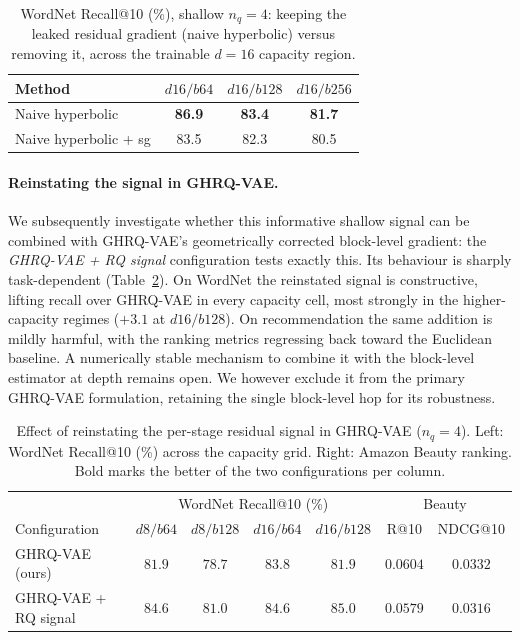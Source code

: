 \documentclass[12pt]{report}
\begin{document}
\begin{table}[h]
\centering
\caption{WordNet Recall@10 (\%), shallow $n_q=4$: keeping the leaked residual gradient (naive hyperbolic) versus removing it, across the trainable $d{=}16$ capacity region.}
\label{tab:gc_leak}
\begin{tabular}{lccc}
\hline
Method & $d16/b64$ & $d16/b128$ & $d16/b256$ \\
\hline
Naive hyperbolic       & \textbf{86.9} & \textbf{83.4} & \textbf{81.7} \\
Naive hyperbolic + sg  & 83.5 & 82.3 & 80.5 \\
\hline
\end{tabular}
\end{table}

\paragraph{Reinstating the signal in GHRQ-VAE.}
We subsequently investigate whether this informative shallow signal can be combined with GHRQ-VAE's geometrically corrected block-level gradient: the \emph{GHRQ-VAE + RQ signal} configuration tests exactly this. Its behaviour is sharply task-dependent (Table~\ref{tab:rq_signal_hybrid}). On WordNet the reinstated signal is constructive, lifting recall over GHRQ-VAE in every capacity cell, most strongly in the higher-capacity regimes ($+3.1$ at $d16/b128$). On recommendation the same addition is mildly harmful, with the ranking metrics regressing back toward the Euclidean baseline. A numerically stable mechanism to combine it with the block-level estimator at depth remains open. We however exclude it from the primary GHRQ-VAE formulation, retaining the single block-level hop for its robustness.

\begin{table}[h]
\centering
\caption{Effect of reinstating the per-stage residual signal in GHRQ-VAE ($n_q=4$). Left: WordNet Recall@10 (\%) across the capacity grid. Right: Amazon Beauty ranking. Bold marks the better of the two configurations per column.}
\label{tab:rq_signal_hybrid}
\begin{tabular}{l|cccc|cc}
\hline
 & \multicolumn{4}{c|}{WordNet Recall@10 (\%)} & \multicolumn{2}{c}{Beauty} \\
Configuration & $d8/b64$ & $d8/b128$ & $d16/b64$ & $d16/b128$ & R@10 & NDCG@10 \\
\hline
GHRQ-VAE (ours)        & $81.9$ & $78.7$ & $83.8$ & $81.9$ & $\mathbf{0.0604}$ & $\mathbf{0.0332}$ \\
GHRQ-VAE + RQ signal   & $\mathbf{84.6}$ & $\mathbf{81.0}$ & $\mathbf{84.6}$ & $\mathbf{85.0}$ & $0.0579$ & $0.0316$ \\
\hline
\end{tabular}
\end{table}
\end{document}
